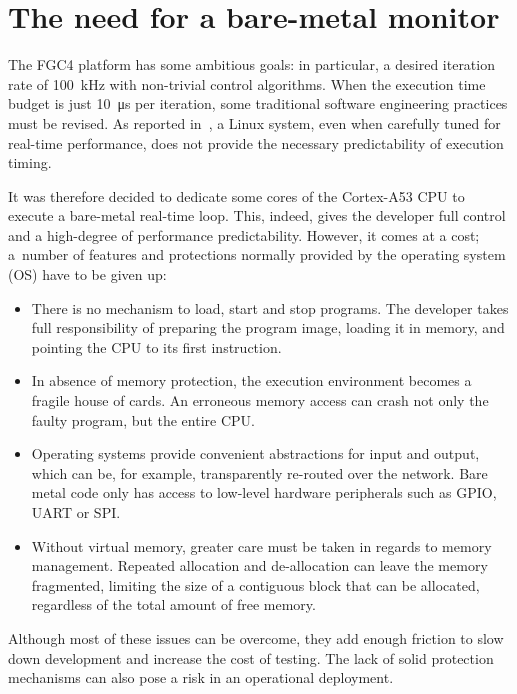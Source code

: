 \section{The need for a bare-metal monitor}

The FGC4 platform has some ambitious goals: in particular, a desired iteration rate of \qty{100}{\kHz} with non-trivial control algorithms. When the execution time budget is just \qty{10}{\us} per iteration, some traditional software engineering practices must be revised. As reported in~\cite{zielinski:task-isolation}, a Linux system, even when carefully tuned for real-time performance, does not provide the necessary predictability of execution timing.

It was therefore decided to dedicate some cores of the Cortex-A53 CPU to execute a bare-metal real-time loop. This, indeed, gives the developer full control and a high-degree of performance predictability. However, it comes at a cost; a~number of features and protections normally provided by the operating system (OS) have to be given up:

\begin{itemize}
    \item There is no mechanism to load, start and stop programs. The developer takes full responsibility of preparing the program image, loading it in memory, and pointing the CPU to its first instruction.
    \item In absence of memory protection, the execution environment becomes a fragile house of cards. An erroneous memory access can crash not only the faulty program, but the entire CPU.
    \item Operating systems provide convenient abstractions for input and output, which can be, for example, transparently re-routed over the network. Bare metal code only has access to low-level hardware peripherals such as GPIO, UART or SPI.
    \item Without virtual memory, greater care must be taken in regards to memory management. Repeated allocation and de-allocation can leave the memory fragmented, limiting the size of a contiguous block that can be allocated, regardless of the total amount of free memory.
\end{itemize}

Although most of these issues can be overcome, they add enough friction to slow down development and increase the cost of testing. The lack of solid protection mechanisms can also pose a risk in an operational deployment.

